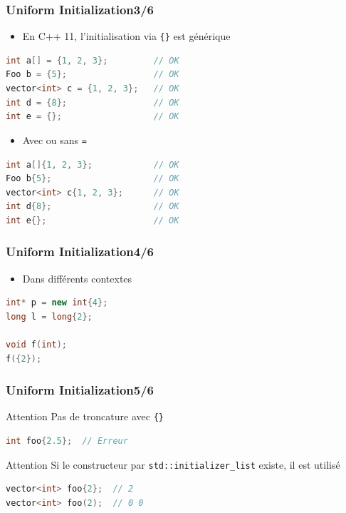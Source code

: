 \documentclass[C++.tex]{subfiles}
\begin{document}
\begin{frame}[fragile]
	\frametitle{Uniform Initialization\titlehfill{}3/6}
	\begin{itemize}
		\item En C++ 11, l'initialisation via \lstinline|{}| est générique
	\end{itemize}

	\begin{lstlisting}[language=C++]
int a[] = {1, 2, 3};         // OK
Foo b = {5};                 // OK
vector<int> c = {1, 2, 3};   // OK
int d = {8};                 // OK
int e = {};                  // OK\end{lstlisting}

	\pause

	\begin{itemize}
		\item Avec ou sans \lstinline|=|
	\end{itemize}

	\begin{lstlisting}[language=C++]
int a[]{1, 2, 3};            // OK
Foo b{5};                    // OK
vector<int> c{1, 2, 3};      // OK
int d{8};                    // OK
int e{};                     // OK\end{lstlisting}
\end{frame}

\begin{frame}[fragile]
	\frametitle{Uniform Initialization\titlehfill{}4/6}
	\begin{itemize}
		\item Dans différents contextes
	\end{itemize}

	\begin{lstlisting}[language=C++]
int* p = new int{4};
long l = long{2};

void f(int);
f({2});\end{lstlisting}
\end{frame}

\begin{frame}[fragile]
	\frametitle{Uniform Initialization\titlehfill{}5/6}
	\begin{alertblock}{Attention}
		Pas de troncature avec \lstinline|{}|


		\begin{lstlisting}[language=C++]
int foo{2.5};  // Erreur\end{lstlisting}
	\end{alertblock}

	\pause

	\begin{alertblock}{Attention}
		Si le constructeur par \lstinline|std::initializer_list| existe, il est utilisé

		\begin{lstlisting}[language=C++]
vector<int> foo{2};  // 2
vector<int> foo(2);  // 0 0\end{lstlisting}
	\end{alertblock}
\end{frame}
\end{document}
